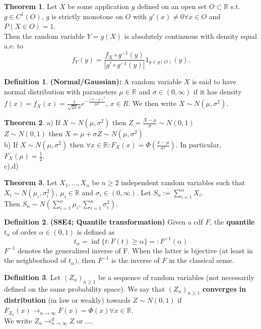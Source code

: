 \documentclass[11pt]{article}
\theoremstyle{definition}
\newtheorem{thm}{Theorem}
\newtheorem{defn}{Definition}
\begin{document}
\begin{thm}
Let $X$ be some application $g$ defined on an open set $O\subset \mathbb{R}$ s.t. $g\in C^1(O)$, $g$ is strictly monotone on $O$ with $g'(x)\neq 0\forall x\in O$ and $P(X\in O)=1$.
\\Then the random variable $Y=g(X)$ is absolutely continuous with density equal a.e. to $$f_Y(y)=\frac{f_X\circ g^{-1}(y)}{|g'\circ g^{-1}(y)|}1_{y\in g(O)}(y).$$
\end{thm}

\begin{defn}\textbf{(Normal/Gaussian):} A random variable $X$ is said to have normal distribution with parameters $\mu\in\mathbb{R}$ and $\sigma\in (0,\infty)$ if it has density $f(x)=f_X(x)=\frac{1}{\sqrt{2\pi}\sigma}e^{-\frac{(x-\mu)^2}{2\sigma^2}}$, $x \in R$. We then write $X\sim N(\mu,\sigma^2)$.
\end{defn}

\begin{thm}
a) If $X\sim N(\mu,\sigma^2)$ then $Z=\frac{X-\mu}{\sigma}\sim N(0,1)$\\
$Z\sim N(0,1) $ then $ X=\mu+\sigma Z \sim N(\mu,\sigma^2)$\\
b) If $X\sim N(\mu,\sigma^2)$ then $\forall x\in \mathbb{R}:F_X(x)=\Phi(\frac{x-\mu}{\sigma^2})$. In particular, $F_X(\mu)=\frac{1}{2}$.\\
c),d)
\end{thm}

\begin{thm}
Let $X_1,...,X_n$ be $n\geq 2$ independent random variables such that $X_i\sim N(\mu_i,\sigma_i^2)$, $\mu_i\in\mathbb{R}$ and $\sigma_i\in(0,\infty)$. Let $S_n:=\sum^n_{i=1} X_i$. \\
Then $S_n\sim N(\sum^n_{i=1}\mu_i , \sum^n_{i=1}\sigma_i^2)$.
\end{thm}

\begin{defn}\textbf{(S8E4; Quantile transformation)}
Given a cdf $F$, the \textbf{quantile} $t_{\alpha}$ of order $\alpha\in(0,1)$ is defined as
\[t_{\alpha}=\inf\{t:F(t)\geq\alpha\}=:F^{-1}(\alpha)\]
$F^{-1}$ denotes the generalized inverse of F. When the latter is bijective (at least in the neighborhood of $t_{\alpha})$, then $F^{-1}$ is the inverse of $F$ in the classical sense.
\end{defn}

\begin{defn}
Let $(Z_n)_{n\geq 1}$ be a sequence of random variables (not necessarily defined on the same probability space). We say that $(Z_n)_{n\geq 1}$ \textbf{converges in distribution} (in law or weakly) towards $Z\sim N(0,1)$ if $F_{Z_n}(x)\rightarrow_{n\rightarrow\infty} F(x)=\Phi(x)\forall x\in \mathbb{R}$.\\
We write $Z_n\rightarrow^d_{n\rightarrow\infty} Z$ or ....
\end{defn}
\end{document}
